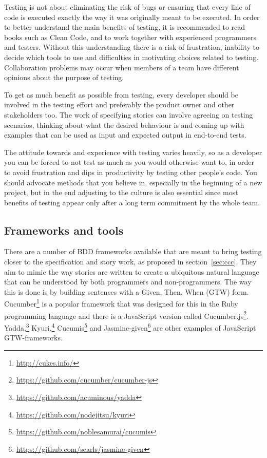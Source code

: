 \documentclass[11pt]{article}
\begin{document}
Testing is not about eliminating the risk of bugs or ensuring that every line of code is executed exactly the way it was originally meant to be executed. In order to better understand the main benefits of testing, it is recommended to read books such as Clean Code, and to work together with experienced programmers and testers. Without this understanding there is a risk of frustration, inability to decide which tools to use and difficulties in motivating choices related to testing. Collaboration problems may occur when members of a team have different opinions about the purpose of testing. \cite[question~38]{Edelstam}

To get as much benefit as possible from testing, every developer should be involved in the testing effort and preferably the product owner and other stakeholders too. The work of specifying stories can involve agreeing on testing scenarios, thinking about what the desired behaviour is and coming up with examples that can be used as input and expected output in end-to-end tests. \cite[questions~39-40]{Edelstam}\cite[question~30]{Stenmark}

The attitude towards and experience with testing varies heavily, so as a developer you can be forced to not test as much as you would otherwise want to, in order to avoid frustration and dips in productivity by testing other people's code. You should advocate methods that you believe in, especially in the beginning of a new project, but in the end adjusting to the culture is also essential since most benefits of testing appear only after a long term commitment by the whole team. \cite[questions~31-32]{Stenmark}

\subsection{Frameworks and tools}
\label{sec:tools}

There are a number of BDD frameworks available that are meant to bring testing closer to the specification and story work, as proposed in section~\ref{sec:ccc}. They aim to mimic the way stories are written to create a ubiquitous natural language that can be understood by both programmers and non-programmers. The way this is done is by building sentences with a Given, Then, When (GTW) form. Cucumber\footnote{\url{http://cukes.info/}} is a popular framework that was designed for this in the Ruby programming language and there is a JavaScript version called Cucumber.js\footnote{\url{https://github.com/cucumber/cucumber-js}}.
Yadda,\footnote{\url{https://github.com/acuminous/yadda}}
Kyuri,\footnote{\url{https://github.com/nodejitsu/kyuri}}
Cucumis\footnote{\url{https://github.com/noblesamurai/cucumis}} and
Jasmine-given\footnote{\url{https://github.com/searls/jasmine-given}}
are other examples of JavaScript GTW-frameworks. \cite[section 8.4]{BDDJS}
\end{document}
